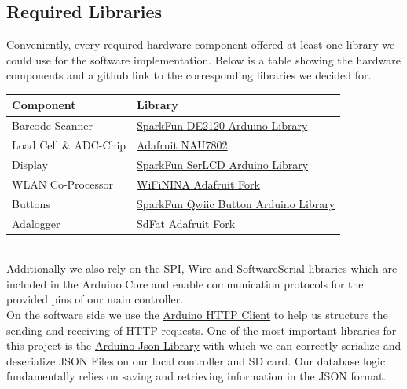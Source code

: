 \documentclass{article}
\begin{document}
\subsection{Required Libraries}
Conveniently, every required hardware component offered at least one library we could use for the software implementation. 
Below is a table showing the hardware components and a github link to the corresponding libraries we decided for.
\\[10pt]
\begin{tabular}{l l}
	\hline
	Component              & Library\\
	\hline
	Barcode-Scanner        & \href{https://github.com/sparkfun/SparkFun_DE2120_Arduino_Library}{SparkFun DE2120 Arduino Library}\\
	Load Cell \& ADC-Chip  & \href{https://github.com/adafruit/Adafruit_NAU7802}{Adafruit NAU7802}\\
	Display                & \href{https://github.com/sparkfun/SparkFun_SerLCD_Arduino_Library}{SparkFun SerLCD Arduino Library}\\
	WLAN Co-Processor      & \href{https://github.com/adafruit/WiFiNINA}{WiFiNINA Adafruit Fork}\\
	Buttons                & \href{https://github.com/sparkfun/SparkFun_Qwiic_Button_Arduino_Library}{SparkFun Qwiic Button Arduino Library}\\
	Adalogger              & \href{https://github.com/adafruit/SdFat}{SdFat Adafruit Fork}\\
	\hline
\end{tabular} \\[10pt]
Additionally we also rely on the SPI, Wire and SoftwareSerial libraries which are included in the Arduino Core and enable communication protocols for the provided pins of our main controller. \\
On the software side we use the \href{https://github.com/arduino-libraries/ArduinoHttpClient}{Arduino HTTP Client} to help us structure the sending and receiving of HTTP requests.
One of the most important libraries for this project is the \href{https://github.com/bblanchon/ArduinoJson}{Arduino Json Library} with which we can correctly serialize and deserialize JSON Files on our local controller and SD card.
Our database logic fundamentally relies on saving and retrieving information in the JSON format. \\
\end{document}
